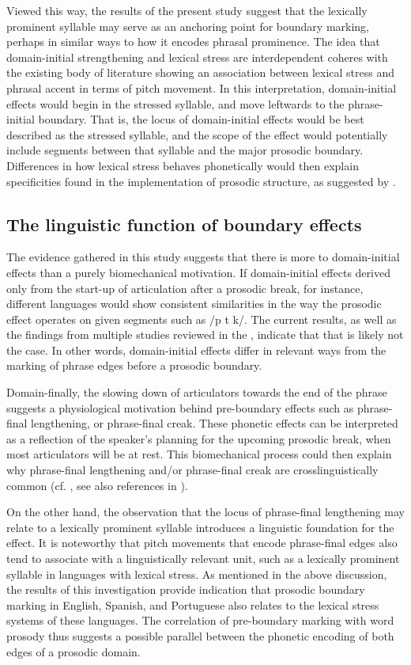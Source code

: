 \documentclass[output=paper]{langscibook}
\begin{document}
Viewed this way, the results of the present study suggest that the lexically prominent syllable may serve as an anchoring point for boundary marking, perhaps in similar ways to how it encodes phrasal prominence. The idea that domain-initial strengthening and lexical stress are interdependent coheres with the existing body of literature showing an association between lexical stress and phrasal accent in terms of pitch movement. In this interpretation, domain-initial effects would begin in the stressed syllable, and move leftwards to the phrase-initial boundary. That is, the locus of domain-initial effects would be best described as the stressed syllable, and the scope of the effect would potentially include segments between that syllable and the major prosodic boundary. Differences in how lexical stress behaves phonetically would then explain specificities found in the implementation of prosodic structure, as suggested by \citet{c16}.


\subsection{The linguistic function of boundary effects}
The evidence gathered in this study suggests that there is more to domain-initial effects than a purely biomechanical motivation. If domain-initial effects derived only from the start-up of articulation after a prosodic break, for instance, different languages would show consistent similarities in the way the prosodic effect operates on given segments such as /p t k/. The current results, as well as the findings from multiple studies reviewed in the , indicate that that is likely not the case. In other words, domain-initial effects differ in relevant ways from the marking of phrase edges before a prosodic boundary. 

Domain-finally, the slowing down of articulators towards the end of the phrase suggests a physiological motivation behind pre-boundary effects such as phrase-final lengthening, or phrase-final creak. These phonetic effects can be interpreted as a reflection of the speaker’s planning for the upcoming prosodic break, when most articulators will be at rest. This biomechanical process could then explain why phrase-final lengthening and/or phrase-final creak are crosslinguistically common (cf. \citealt{j05, j14}, see also references in \citealt{g15}). 

On the other hand, the observation that the locus of phrase-final lengthening may relate to a lexically prominent syllable introduces a linguistic foundation for the effect. It is noteworthy that pitch movements that encode phrase-final edges also tend to associate with a linguistically relevant unit, such as a lexically prominent syllable in languages with lexical stress. As mentioned in the above discussion, the results of this investigation provide indication that prosodic boundary marking in English, Spanish, and Portuguese also relates to the lexical stress systems of these languages. The correlation of pre-boundary marking with word prosody thus suggests a possible parallel between the phonetic encoding of both edges of a prosodic domain. 
\end{document}

